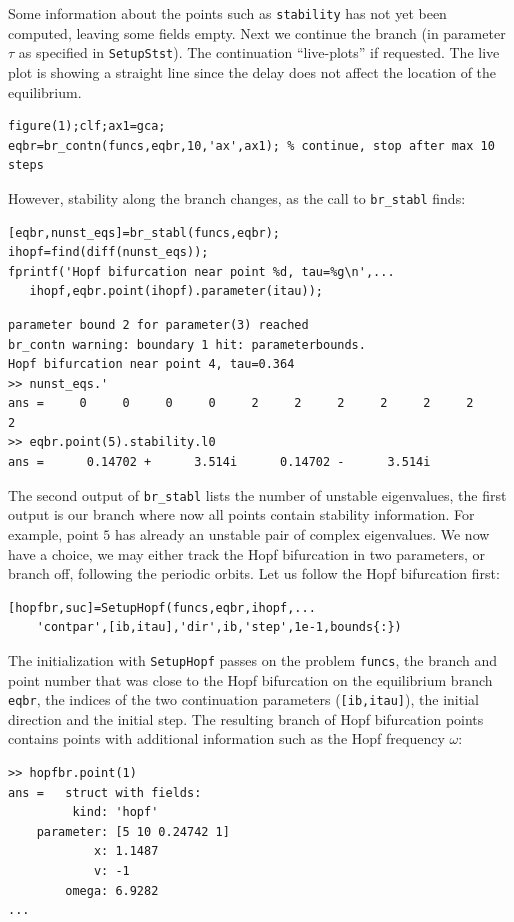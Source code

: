 \documentclass[10pt]{scrartcl}
\newcommand{\blist}[1]{\mbox{\lstinline!#1!}}
\begin{document}
Some information about the points such as \texttt{stability} has not yet been
computed, leaving some fields empty. Next we continue the branch (in
parameter $\tau$ as specified in \blist{SetupStst}). The continuation
``live-plots'' if requested. The live plot is showing a straight
line since the delay does not affect the location of the equilibrium.
\begin{lstlisting}
figure(1);clf;ax1=gca;
eqbr=br_contn(funcs,eqbr,10,'ax',ax1); % continue, stop after max 10 steps
\end{lstlisting}
However, stability along the branch changes, as the call to \blist{br_stabl} finds:
\begin{lstlisting}
[eqbr,nunst_eqs]=br_stabl(funcs,eqbr);
ihopf=find(diff(nunst_eqs));
fprintf('Hopf bifurcation near point %d, tau=%g\n',...
   ihopf,eqbr.point(ihopf).parameter(itau));
\end{lstlisting}
\begin{verbatim}
parameter bound 2 for parameter(3) reached
br_contn warning: boundary 1 hit: parameterbounds.
Hopf bifurcation near point 4, tau=0.364
>> nunst_eqs.'
ans =     0     0     0     0     2     2     2     2     2     2     2
>> eqbr.point(5).stability.l0
ans =      0.14702 +      3.514i      0.14702 -      3.514i
\end{verbatim}
The second output of \blist{br_stabl} lists the number of unstable eigenvalues, the first output is our branch where now all points contain stability information. For example, point $5$ has already an unstable pair of complex eigenvalues. We now have a choice, we may either track the Hopf bifurcation in two parameters, or branch off, following the periodic orbits. Let us follow the Hopf bifurcation first:
\begin{lstlisting}
[hopfbr,suc]=SetupHopf(funcs,eqbr,ihopf,...
    'contpar',[ib,itau],'dir',ib,'step',1e-1,bounds{:})
\end{lstlisting}
The initialization with \blist{SetupHopf} passes on the problem
\blist{funcs}, the branch and point number that was close to the Hopf
bifurcation on the equilibrium branch \blist{eqbr}, the indices of the two
continuation parameters (\blist{[ib,itau]}), the initial direction and
the initial step. The resulting branch of Hopf bifurcation points
contains points with additional information such as the Hopf frequency
$\omega$:
\begin{verbatim}
>> hopfbr.point(1)
ans =   struct with fields:
         kind: 'hopf'
    parameter: [5 10 0.24742 1]
            x: 1.1487
            v: -1
        omega: 6.9282
...
\end{verbatim}
\end{document}
